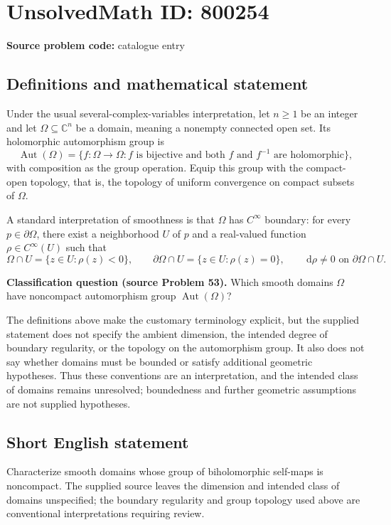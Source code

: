 \documentclass[11pt]{article}
\newcommand{\C}{\mathbb{C}}
\newcommand{\dd}{\,\mathrm{d}}
\begin{document}
\section*{UnsolvedMath ID: 800254}
\textbf{Source problem code:} catalogue entry
\subsection{Definitions and mathematical statement}
Under the usual several-complex-variables interpretation, let \(n\geq 1\) be an integer and let \(\Omega\subseteq\C^n\) be a domain, meaning a nonempty connected open set. Its holomorphic automorphism group is
\[
\operatorname{Aut}(\Omega)=\{f:\Omega\to\Omega: f\text{ is bijective and both }f\text{ and }f^{-1}\text{ are holomorphic}\},
\]
with composition as the group operation. Equip this group with the compact-open topology, that is, the topology of uniform convergence on compact subsets of \(\Omega\).

A standard interpretation of smoothness is that \(\Omega\) has \(C^\infty\) boundary: for every \(p\in\partial\Omega\), there exist a neighborhood \(U\) of \(p\) and a real-valued function \(\rho\in C^\infty(U)\) such that
\[
\Omega\cap U=\{z\in U:\rho(z)<0\},\qquad
\partial\Omega\cap U=\{z\in U:\rho(z)=0\},\qquad
\dd\rho\neq 0\text{ on }\partial\Omega\cap U.
\]

\textbf{Classification question (source Problem 53).} Which smooth domains \(\Omega\) have noncompact automorphism group \(\operatorname{Aut}(\Omega)\)?

The definitions above make the customary terminology explicit, but the supplied statement does not specify the ambient dimension, the intended degree of boundary regularity, or the topology on the automorphism group. It also does not say whether domains must be bounded or satisfy additional geometric hypotheses. Thus these conventions are an interpretation, and the intended class of domains remains unresolved; boundedness and further geometric assumptions are not supplied hypotheses.
\subsection{Short English statement}
Characterize smooth domains whose group of biholomorphic self-maps is noncompact. The supplied source leaves the dimension and intended class of domains unspecified; the boundary regularity and group topology used above are conventional interpretations requiring review.
\end{document}
